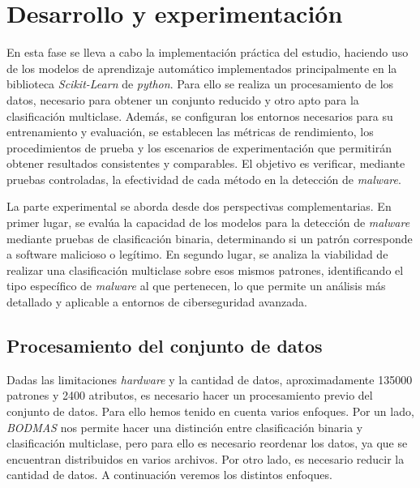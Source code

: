 \chapter{Desarrollo y experimentación}
\label{ch:desarrollo}

En esta fase se lleva a cabo la implementación práctica del estudio, haciendo uso de los modelos de aprendizaje automático implementados principalmente en la biblioteca \textit{Scikit-Learn} de \textit{python}. Para ello se realiza un procesamiento de los datos, necesario para obtener un conjunto reducido y otro apto para la clasificación multiclase. Además, se configuran los entornos necesarios para su entrenamiento y evaluación, se establecen las métricas de rendimiento, los procedimientos de prueba y los escenarios de experimentación que permitirán obtener resultados consistentes y comparables. El objetivo es verificar, mediante pruebas controladas, la efectividad de cada método en la detección de \textit{malware}.

\vspace{1em}

La parte experimental se aborda desde dos perspectivas complementarias. En primer lugar, se evalúa la capacidad de los modelos para la detección de \textit{malware} mediante pruebas de clasificación binaria, determinando si un patrón corresponde a software malicioso o legítimo. En segundo lugar, se analiza la viabilidad de realizar una clasificación multiclase sobre esos mismos patrones, identificando el tipo específico de \textit{malware} al que pertenecen, lo que permite un análisis más detallado y aplicable a entornos de ciberseguridad avanzada.

\newpage
\section{Procesamiento del conjunto de datos}
\label{sec:proc_dataset}

Dadas las limitaciones \textit{hardware} y la cantidad de datos, aproximadamente 135000 patrones y 2400 atributos, es necesario hacer un procesamiento previo del conjunto de datos. Para ello hemos tenido en cuenta varios enfoques. Por un lado, \textit{BODMAS} nos permite hacer una distinción entre clasificación binaria y clasificación multiclase, pero para ello es necesario reordenar los datos, ya que se encuentran distribuidos en varios archivos. Por otro lado, es necesario reducir la cantidad de datos. A continuación veremos los distintos enfoques.

